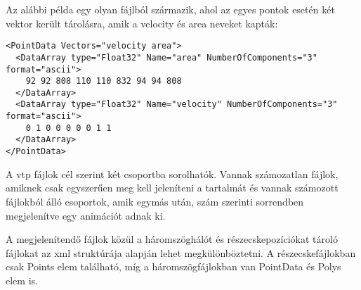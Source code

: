 Az alábbi példa egy olyan fájlból származik, 
ahol az egyes pontok esetén két vektor került tárolásra, 
amik a {\ttfamily velocity} és {\ttfamily area} neveket kapták:
\begin{lstlisting}[style=customxml]
<PointData Vectors="velocity area">
  <DataArray type="Float32" Name="area" NumberOfComponents="3" format="ascii">
    92 92 808 110 110 832 94 94 808 
  </DataArray>
  <DataArray type="Float32" Name="velocity" NumberOfComponents="3" format="ascii">
    0 1 0 0 0 0 0 1 1 
  </DataArray>
</PointData>
\end{lstlisting}
A vtp fájlok cél szerint két csoportba sorolhatók. 
Vannak számozatlan fájlok, 
amiknek csak egyszerűen meg kell jeleníteni a tartalmát 
és vannak számozott fájlokból álló csoportok, 
amik egymás után, 
szám szerinti sorrendben megjelenítve egy animációt adnak ki. 

A megjelenítendő fájlok közül a háromszöghálót 
és részecskepozíciókat tároló fájlokat az xml struktúrája alapján 
lehet megkülönböztetni. 
A részecskefájlokban csak {\ttfamily Points} elem található, 
míg a háromszögfájlokban van {\ttfamily PointData} 
és {\ttfamily Polys} elem is. 


























